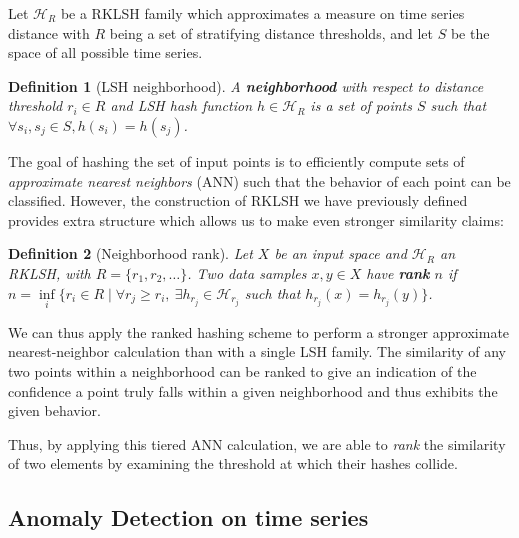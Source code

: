 \documentclass[a4paper]{article}
\theoremstyle{def}
\newtheorem{definition}{Definition}
\theoremstyle{thm}
\newcommand{\LSH}[0]{\mathcal{H}}
\begin{document}
Let ${\LSH}_R$ be a RKLSH family which approximates a measure on time series distance with $R$ being a set of stratifying distance thresholds, and let $S$ be the space of all possible time series.


\begin{definition}[LSH neighborhood]\label{defn:neighborhood}
    A \textbf{neighborhood} with respect to distance threshold $r_i \in R$ and LSH hash function $h \in {\LSH}_R$ is a set of points $S$ such that $\forall s_i, s_j \in S, h(s_i) = h(s_j)$.
\end{definition}

The goal of hashing the set of input points is to efficiently compute sets of \textit{approximate nearest neighbors} (ANN) such that the behavior of each point can be classified.
However, the construction of RKLSH we have previously defined provides extra structure which allows us to make even stronger similarity claims:

\begin{definition}[Neighborhood rank]\label{defn:neighborhood_rank}
    Let $X$ be an input space and ${\LSH}_R$ an RKLSH, with $R = \{r_1, r_2, \ldots\}$.
    Two data samples $x,y \in X$ have \textbf{rank} $n$ if $n = \inf\limits_i\{ r_i \in R \mid \forall r_j \ge r_i,~\exists h_{r_j} \in {\LSH}_{r_j}$ such that $h_{r_j}(x) = h_{r_j}(y) \}$.
\end{definition}

We can thus apply the ranked hashing scheme to perform a stronger approximate nearest-neighbor calculation than with a single LSH family.
The similarity of any two points within a neighborhood can be ranked to give an indication of the confidence a point truly falls within a given neighborhood and thus exhibits the given behavior.

Thus, by applying this tiered ANN calculation, we are able to \textit{rank} the similarity of two elements by examining the threshold at which their hashes collide.

\subsection{Anomaly Detection on time series}
\label{subsec:anomaly_detection}
\end{document}
